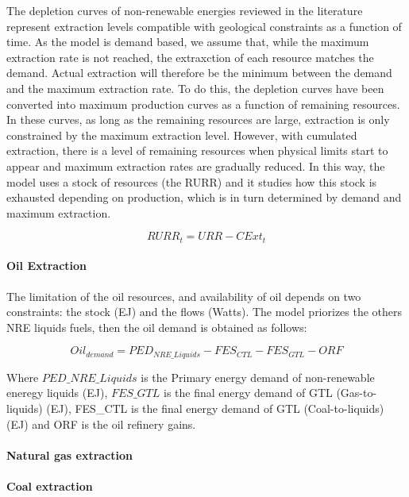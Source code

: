 The depletion curves of non-renewable energies reviewed in the literature represent extraction
levels compatible with geological constraints as a function of time. As the model is demand based, we assume that, while the maximum extraction rate is not reached, the extraxction of each resource matches the demand. Actual
extraction will therefore be the minimum between the demand and the maximum extraction rate. To do this, the depletion curves have been converted into maximum production
curves as a function of remaining resources. In these curves, as long as the remaining resources are
large, extraction is only constrained by the maximum extraction level. However, with cumulated
extraction, there is a level of remaining resources when physical limits start to appear and maximum
extraction rates are gradually reduced. In this way, the model uses a stock of resources (the RURR)
and it studies how this stock is exhausted depending on production, which is in turn determined by
demand and maximum extraction.

\begin{equation}
    RURR_t=URR - CExt_t
    \label{eq:available_stock}
\end{equation}
    

\paragraph{Oil Extraction}
The limitation of the oil resources, and availability of oil depends on two constraints: the stock (EJ) and the flows (Watts). The model priorizes the others NRE liquids fuels, then the oil demand is obtained as follows:

\begin{equation}
Oil_{demand}=PED_{NRE\_Liquids}-FES_{CTL}- FES_{GTL}- ORF
\label{eq:oil-demand}
\end{equation}

Where $PED\_NRE\_Liquids$ is the Primary energy demand of non-renewable eneregy liquids (EJ), $FES\_GTL$ is the final energy demand of GTL (Gas-to-liquids) (EJ),  FES\_CTL is the final energy demand of GTL (Coal-to-liquids) (EJ) and ORF is the oil refinery gains.

\paragraph{Natural gas extraction}

\paragraph{Coal extraction}

